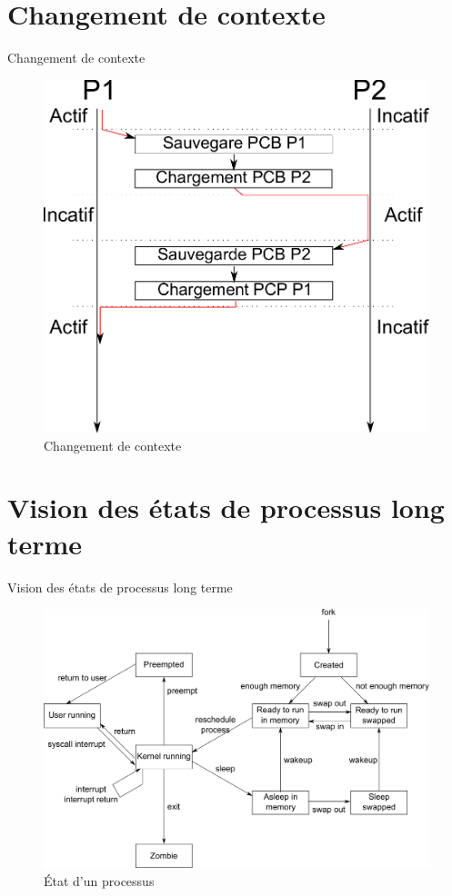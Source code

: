 
\def\sectitle{Changement de contexte}
\section{\sectitle}

\begin{frame}{\sectitle}
\begin{figure}
\includegraphics[width=.9\textwidth]{images/ContextChange.pdf}
\caption{Changement de contexte}
\end{figure}
\end{frame}

\def\sectitle{Vision des états de processus long terme}
\section{\sectitle}
\begin{frame}{\sectitle}
\begin{figure}
\includegraphics[width=.9\textwidth]{images/StateFull.pdf}
\caption{État d'un processus}
\end{figure}
\end{frame}



